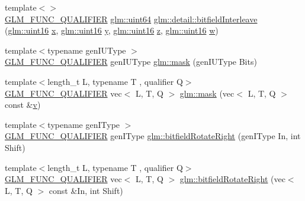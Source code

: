 \begin{DoxyCompactItemize}
\item 
{\footnotesize template$<$$>$ }\\\mbox{\hyperlink{setup_8hpp_a33fdea6f91c5f834105f7415e2a64407}{G\+L\+M\+\_\+\+F\+U\+N\+C\+\_\+\+Q\+U\+A\+L\+I\+F\+I\+ER}} \mbox{\hyperlink{group__gtc__type__precision_gae3632bf9b37da66233d78930dd06378a}{glm\+::uint64}} \mbox{\hyperlink{namespaceglm_1_1detail_a3ed141c5adbf2e1209ffe2081d98ba4c}{glm\+::detail\+::bitfield\+Interleave}} (\mbox{\hyperlink{group__gtc__type__precision_gad8c2939e1fdd8e5828b31d95c52255d5}{glm\+::uint16}} \mbox{\hyperlink{_s_d_l__opengl_8h_ad0e63d0edcdbd3d79554076bf309fd47}{x}}, \mbox{\hyperlink{group__gtc__type__precision_gad8c2939e1fdd8e5828b31d95c52255d5}{glm\+::uint16}} \mbox{\hyperlink{_s_d_l__opengl_8h_a1675d9d7bb68e1657ff028643b4037e3}{y}}, \mbox{\hyperlink{group__gtc__type__precision_gad8c2939e1fdd8e5828b31d95c52255d5}{glm\+::uint16}} \mbox{\hyperlink{_s_d_l__opengl__glext_8h_a5e74030ebb3297ce1b37ff716fedd68f}{z}}, \mbox{\hyperlink{group__gtc__type__precision_gad8c2939e1fdd8e5828b31d95c52255d5}{glm\+::uint16}} \mbox{\hyperlink{_s_d_l__opengl__glext_8h_a6ee8f168a7ab6785a9bb57c6715dad99}{w}})
\item 
{\footnotesize template$<$typename gen\+I\+U\+Type $>$ }\\\mbox{\hyperlink{setup_8hpp_a33fdea6f91c5f834105f7415e2a64407}{G\+L\+M\+\_\+\+F\+U\+N\+C\+\_\+\+Q\+U\+A\+L\+I\+F\+I\+ER}} gen\+I\+U\+Type \mbox{\hyperlink{group__gtc__bitfield_gad7eba518a0b71662114571ee76939f8a}{glm\+::mask}} (gen\+I\+U\+Type Bits)
\item 
{\footnotesize template$<$length\+\_\+t L, typename T , qualifier Q$>$ }\\\mbox{\hyperlink{setup_8hpp_a33fdea6f91c5f834105f7415e2a64407}{G\+L\+M\+\_\+\+F\+U\+N\+C\+\_\+\+Q\+U\+A\+L\+I\+F\+I\+ER}} vec$<$ L, T, Q $>$ \mbox{\hyperlink{group__gtc__bitfield_ga2e64e3b922a296033b825311e7f5fff1}{glm\+::mask}} (vec$<$ L, T, Q $>$ const \&\mbox{\hyperlink{_s_d_l__opengl_8h_a10a82eabcb59d2fcd74acee063775f90}{v}})
\item 
{\footnotesize template$<$typename gen\+I\+Type $>$ }\\\mbox{\hyperlink{setup_8hpp_a33fdea6f91c5f834105f7415e2a64407}{G\+L\+M\+\_\+\+F\+U\+N\+C\+\_\+\+Q\+U\+A\+L\+I\+F\+I\+ER}} gen\+I\+Type \mbox{\hyperlink{namespaceglm_a29f065281c52cf3ca7695e71504687fc}{glm\+::bitfield\+Rotate\+Right}} (gen\+I\+Type In, int Shift)
\item 
{\footnotesize template$<$length\+\_\+t L, typename T , qualifier Q$>$ }\\\mbox{\hyperlink{setup_8hpp_a33fdea6f91c5f834105f7415e2a64407}{G\+L\+M\+\_\+\+F\+U\+N\+C\+\_\+\+Q\+U\+A\+L\+I\+F\+I\+ER}} vec$<$ L, T, Q $>$ \mbox{\hyperlink{group__gtc__bitfield_ga590488e1fc00a6cfe5d3bcaf93fbfe88}{glm\+::bitfield\+Rotate\+Right}} (vec$<$ L, T, Q $>$ const \&In, int Shift)

\end{DoxyCompactItemize}
